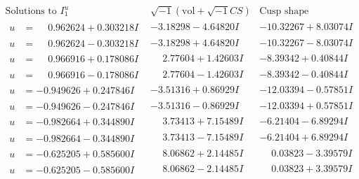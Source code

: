 \documentclass[1p]{elsarticle_modified}
\theoremstyle{definition}
\newcommand{\I}{\sqrt{-1}}
\begin{document}
$$\begin{array}{c|c|c}  
\text{Solutions to }I^u_{1}& \I (\text{vol} + \sqrt{-1}CS) & \text{Cusp shape}\\
 \hline 
\begin{aligned}
u &= \phantom{-}0.962624 + 0.303218 I\end{aligned}
 & -3.18298 - 4.64820 I & -10.32267 + 8.03074 I \\ \hline\begin{aligned}
u &= \phantom{-}0.962624 - 0.303218 I\end{aligned}
 & -3.18298 + 4.64820 I & -10.32267 - 8.03074 I \\ \hline\begin{aligned}
u &= \phantom{-}0.966916 + 0.178086 I\end{aligned}
 & \phantom{-}2.77604 + 1.42603 I & -8.39342 + 0.40844 I \\ \hline\begin{aligned}
u &= \phantom{-}0.966916 - 0.178086 I\end{aligned}
 & \phantom{-}2.77604 - 1.42603 I & -8.39342 - 0.40844 I \\ \hline\begin{aligned}
u &= -0.949626 + 0.247846 I\end{aligned}
 & -3.51316 + 0.86929 I & -12.03394 - 0.57851 I \\ \hline\begin{aligned}
u &= -0.949626 - 0.247846 I\end{aligned}
 & -3.51316 - 0.86929 I & -12.03394 + 0.57851 I \\ \hline\begin{aligned}
u &= -0.982664 + 0.344890 I\end{aligned}
 & \phantom{-}3.73413 + 7.15489 I & -6.21404 - 6.89294 I \\ \hline\begin{aligned}
u &= -0.982664 - 0.344890 I\end{aligned}
 & \phantom{-}3.73413 - 7.15489 I & -6.21404 + 6.89294 I \\ \hline\begin{aligned}
u &= -0.625205 + 0.585600 I\end{aligned}
 & \phantom{-}8.06862 + 2.14485 I & \phantom{-}0.03823 - 3.39579 I \\ \hline\begin{aligned}
u &= -0.625205 - 0.585600 I\end{aligned}
 & \phantom{-}8.06862 - 2.14485 I & \phantom{-}0.03823 + 3.39579 I \\ \hline\begin{aligned}

\end{aligned}
\end{array}$$
\end{document}
